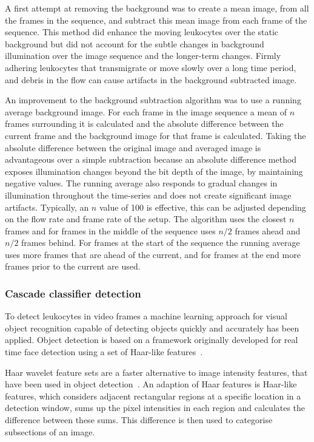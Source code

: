 A first attempt at removing the background was to create a mean image, from all the frames in the sequence, and subtract this mean image from each frame of the sequence. This method did enhance the moving leukocytes over the static background but did not account for the subtle changes in background illumination over the image sequence and the longer-term changes. Firmly adhering leukocytes that transmigrate or move slowly over a long time period, and debris in the flow can cause artifacts in the background subtracted image.

An improvement to the background subtraction algorithm was to use a running average background image. For each frame in the image sequence a mean of $n$ frames surrounding it is calculated and the absolute difference between the current frame and the background image for that frame is calculated. Taking the absolute difference between the original image and averaged image is advantageous over a simple subtraction because an absolute difference method exposes illumination changes beyond the bit depth of the image, by maintaining negative values. The running average also responds to gradual changes in illumination throughout the time-series and does not create significant image artifacts. Typically, an $n$ value of 100 is effective, this can be adjusted depending on the flow rate and frame rate of the setup. The algorithm uses the closest $n$ frames and for frames in the middle of the sequence uses $n/2$ frames ahead and $n/2$ frames behind. For frames at the start of the sequence the running average uses more frames that are ahead of the current, and for frames at the end more frames prior to the current are used.

\subsubsection{Cascade classifier detection}
To detect leukocytes in video frames a machine learning approach for visual object recognition capable of detecting objects quickly and accurately has been applied. Object detection is based on a framework originally developed for real time face detection using a set of Haar-like features~\cite{Viola2001, Lienhart2002}.

Haar wavelet feature sets are a faster alternative to image intensity features, that have been used in object detection~\cite{Papageorgiou1998}. An adaption of Haar features is Haar-like features, which considers adjacent rectangular regions at a specific location in a detection window, sums up the pixel intensities in each region and calculates the difference between these sums. This difference is then used to categorise subsections of an image. 

